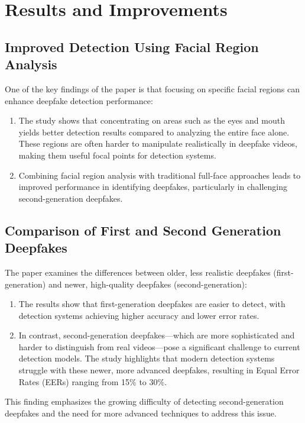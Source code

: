 \documentclass{report}
\begin{document}
	
	
	
	\section{Results and Improvements}
	\subsection{Improved Detection Using Facial Region Analysis}
	One of the key findings of the paper is that focusing on specific facial regions can enhance deepfake detection performance:
	\begin{enumerate}
		\item 
		The study shows that concentrating on areas such as the eyes and mouth yields better detection results compared to analyzing the entire face alone. These regions are often harder to manipulate realistically in deepfake videos, making them useful focal points for detection systems.
		
		\item 
		Combining facial region analysis with traditional full-face approaches leads to improved performance in identifying deepfakes, particularly in challenging second-generation deepfakes.
	\end{enumerate}
	
	
	\subsection{Comparison of First and Second Generation Deepfakes}
	The paper examines the differences between older, less realistic deepfakes (first-generation) and newer, high-quality deepfakes (second-generation):
	
	\begin{enumerate}
		\item 
		The results show that first-generation deepfakes are easier to detect, with detection systems achieving higher accuracy and lower error rates.
		
		\item 
		In contrast, second-generation deepfakes—which are more sophisticated and harder to distinguish from real videos—pose a significant challenge to current detection models. The study highlights that modern detection systems struggle with these newer, more advanced deepfakes, resulting in Equal Error Rates (EERs) ranging from 15\% to 30\%.
	\end{enumerate}
	This finding emphasizes the growing difficulty of detecting second-generation deepfakes and the need for more advanced techniques to address this issue.
	
\end{document}
